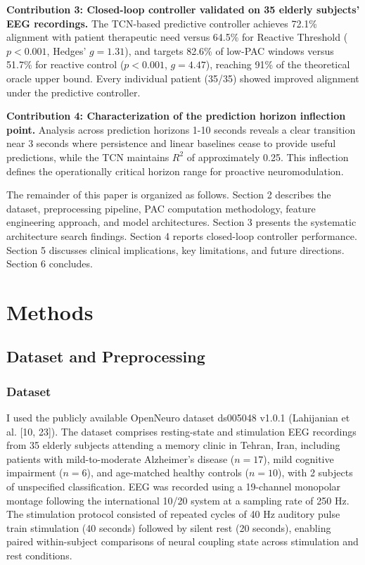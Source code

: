 \documentclass[11pt,letterpaper]{article}
\begin{document}
\textbf{Contribution 3: Closed-loop controller validated on 35 elderly subjects' EEG recordings.} The TCN-based predictive controller achieves 72.1\% alignment with patient therapeutic need versus 64.5\% for Reactive Threshold ($p < 0.001$, Hedges' $g = 1.31$), and targets 82.6\% of low-PAC windows versus 51.7\% for reactive control ($p < 0.001$, $g = 4.47$), reaching 91\% of the theoretical oracle upper bound. Every individual patient (35/35) showed improved alignment under the predictive controller.

\textbf{Contribution 4: Characterization of the prediction horizon inflection point.} Analysis across prediction horizons 1-10 seconds reveals a clear transition near 3 seconds where persistence and linear baselines cease to provide useful predictions, while the TCN maintains $R^2$ of approximately 0.25. This inflection defines the operationally critical horizon range for proactive neuromodulation.

The remainder of this paper is organized as follows. Section 2 describes the dataset, preprocessing pipeline, PAC computation methodology, feature engineering approach, and model architectures. Section 3 presents the systematic architecture search findings. Section 4 reports closed-loop controller performance. Section 5 discusses clinical implications, key limitations, and future directions. Section 6 concludes.

\section{Methods}

\subsection{Dataset and Preprocessing}

\subsubsection{Dataset}

I used the publicly available OpenNeuro dataset ds005048 v1.0.1 (Lahijanian et al. [10, 23]). The dataset comprises resting-state and stimulation EEG recordings from 35 elderly subjects attending a memory clinic in Tehran, Iran, including patients with mild-to-moderate Alzheimer's disease ($n = 17$), mild cognitive impairment ($n = 6$), and age-matched healthy controls ($n = 10$), with 2 subjects of unspecified classification. EEG was recorded using a 19-channel monopolar montage following the international 10/20 system at a sampling rate of 250 Hz. The stimulation protocol consisted of repeated cycles of 40 Hz auditory pulse train stimulation (40 seconds) followed by silent rest (20 seconds), enabling paired within-subject comparisons of neural coupling state across stimulation and rest conditions.
\end{document}
